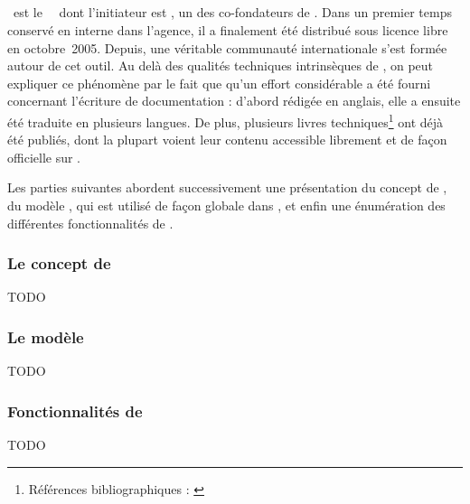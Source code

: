 \subsection{\asf}

\asf\ est le \afm\ \aphp\ dont l'initiateur est \apotencier, un des co-fondateurs de \asl. Dans un premier temps conservé en interne dans l'agence, il a finalement été distribué sous licence libre en octobre~2005. Depuis, une véritable communauté internationale s'est formée autour de cet outil. Au delà des qualités techniques intrinsèques de \asf, on peut expliquer ce phénomène par le fait que qu'un effort considérable a été fourni concernant l'écriture de documentation : d'abord rédigée en anglais, elle a ensuite été traduite en plusieurs langues. De plus, plusieurs livres techniques\footnote{Références bibliographiques : \cite{practicalsf} \cite{sfrefguide} \cite{cahierssf} \cite{moresf} \cite{thebook}} ont déjà été publiés, dont la plupart voient leur contenu accessible librement et de façon officielle sur \ainternet.

Les parties suivantes abordent successivement une présentation du concept de \afm, du modèle \amvc, qui est utilisé de façon globale dans \asf, et enfin une énumération des différentes fonctionnalités de \asf.


\subsubsection{Le concept de \afm}

TODO


\subsubsection{Le modèle \amvc}

TODO


\subsubsection{Fonctionnalités de \asf}

TODO
